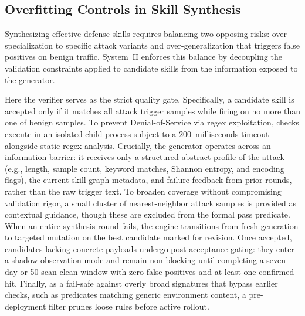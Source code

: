 
\subsection{Overfitting Controls in Skill Synthesis}
\label{app:synthesis-overfit}

Synthesizing effective defense skills requires balancing two opposing
risks: over-specialization to specific attack variants and
over-generalization that triggers false positives on benign
traffic. System~II enforces this balance by decoupling the validation
constraints applied to candidate skills from the information exposed
to the generator.

Here the verifier serves as the strict quality gate. Specifically, a
candidate skill is accepted only if it matches all attack trigger
samples while firing on no more than one of benign samples. To prevent
Denial-of-Service via regex exploitation, checks execute in an
isolated child process subject to a 200~milliseconds timeout alongside
static regex analysis. Crucially, the generator operates across an
information barrier: it receives only a structured abstract profile of
the attack (e.g., length, sample count, keyword matches, Shannon
entropy, and encoding flags), the current skill graph metadata, and
failure feedback from prior rounds, rather than the raw trigger
text. To broaden coverage without compromising validation rigor, a
small cluster of nearest-neighbor attack samples is provided as
contextual guidance, though these are excluded from the formal pass
predicate.
When an entire synthesis round fails, the engine transitions from
fresh generation to targeted mutation on the best candidate marked for
revision. Once accepted, candidates lacking concrete payloads undergo
post-acceptance gating: they enter a shadow observation mode and
remain non-blocking until completing a seven-day or 50-scan clean
window with zero false positives and at least one confirmed
hit. Finally, as a fail-safe against overly broad signatures that
bypass earlier checks, such as predicates matching generic environment
content, a pre-deployment filter prunes loose rules before active rollout.

